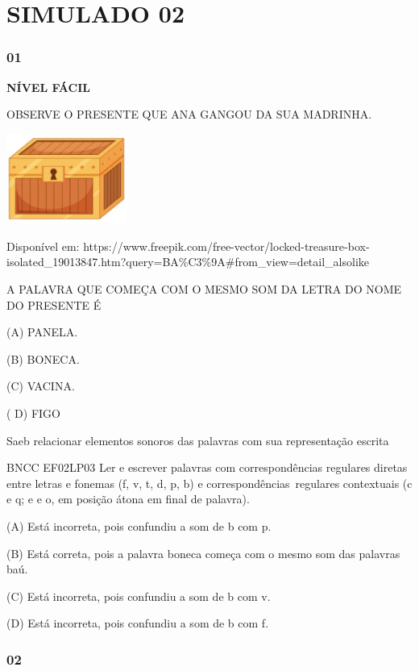 \section{SIMULADO 02}\label{simulado-02}

\subsubsection{01}\label{section-111}

\textbf{NÍVEL FÁCIL}

OBSERVE O PRESENTE QUE ANA GANGOU DA SUA MADRINHA.

\includegraphics[width=1.55556in,height=1.16111in]{media/image147.jpeg}

Disponível em:
https://www.freepik.com/free-vector/locked-treasure-box-isolated\_19013847.htm?query=BA\%C3\%9A\#from\_view=detail\_alsolike

A PALAVRA QUE COMEÇA COM O MESMO SOM DA LETRA DO NOME DO PRESENTE É

(A) PANELA.

(B) BONECA.

(C) VACINA.

( D) FIGO

Saeb relacionar elementos sonoros das palavras com sua representação
escrita

BNCC EF02LP03 Ler e escrever palavras com correspondências regulares
diretas entre letras e fonemas (f, v, t, d, p, b) e
correspondências~regulares contextuais (c e q; e e o, em posição átona
em final de palavra).

(A) Está incorreta, \protect\hypertarget{_Hlk129267612}{}{}pois
confundiu a som de b com p.

(B) Está correta, pois a palavra boneca começa com o mesmo som das
palavras baú.

(C) Está incorreta, pois confundiu a som de b com v.

(D) Está incorreta, pois confundiu a som de b com f.

\subsubsection{02}\label{section-112}

